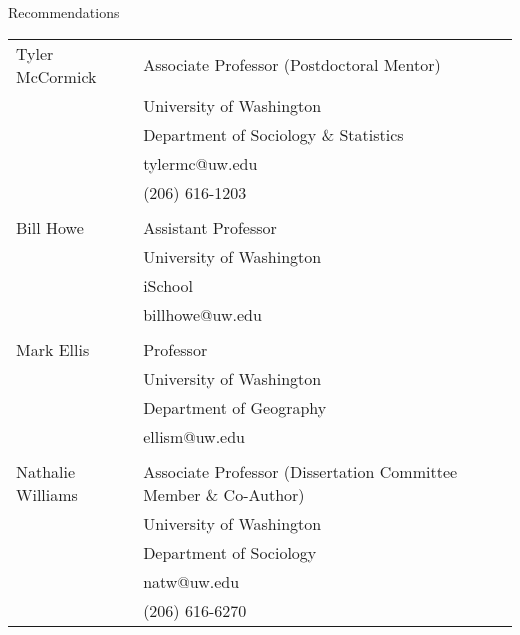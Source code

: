 \documentclass{resume} %
\begin{document}
\begin{rSection}{Recommendations}
\begin{tabular}{ @{} >{}l @{\hspace{6ex}} l }
Tyler McCormick		& Associate Professor (Postdoctoral Mentor)\\
					& University of Washington\\
					& Department of Sociology \& Statistics\\
					& tylermc@uw.edu\\
					& (206) 616-1203\\\\

Bill Howe			& Assistant Professor\\
					& University of Washington\\
					& iSchool\\
					& billhowe@uw.edu\\\\

Mark Ellis			& Professor\\
					& University of Washington\\
					& Department of Geography\\
					& ellism@uw.edu\\\\

Nathalie Williams	& Associate Professor (Dissertation Committee Member \& Co-Author)\\
					& University of Washington\\
					& Department of Sociology\\
					& natw@uw.edu\\
					& (206) 616-6270

\end{tabular}
\vspace{5mm}
\end{rSection}
\end{document}
